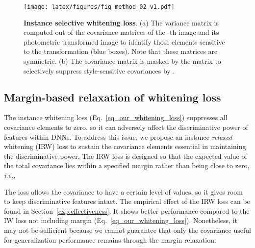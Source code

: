 \documentclass[final]{latex/cvpr}
\begin{document}
\begin{figure*}[ht!]
\vspace*{-0.0cm}
  \centering\texttt{[image: latex/figures/fig\_method\_02\_v1.pdf]}
  \vspace*{-0.0cm}
  \caption{\textbf{Instance selective whitening loss}. 
  (a) 
  The variance matrix  is computed out of the covariance matrices of the -th image  and its photometric transformed image  to identify those elements sensitive to the transformation (blue boxes).
  Note that these matrices are symmetric.
  (b) The covariance matrix  is masked by the matrix  to selectively suppress style-sensitive covariances by .
}
\label{fig:disentangling_covariance}
\vspace{-0.45cm}
\end{figure*}









\vspace*{-0.18cm}
\subsection{Margin-based relaxation of whitening loss}
\vspace*{-0.12cm}
The instance whitening loss (Eq.~\eqref{eq_our_whitening_loss}) suppresses all covariance elements to zero, so it can adversely affect the discriminative power of features within DNNs. To address this issue, we propose an instance-\emph{relaxed} whitening (IRW) loss to sustain the covariance elements essential in maintaining the discriminative power. The IRW loss is designed so that the expected value of the total covariance lies within a specified margin  rather than being close to zero, \textit{i.e.,} 

The loss  allows the covariance to have a certain level of values, so it gives room to keep discriminative features intact. The empirical effect of the IRW loss can be found in Section~\ref{exp:effectiveness}. It shows better performance compared to the IW loss not including margin  (Eq.~\eqref{eq_our_whitening_loss}). Nonetheless, it may not be sufficient because we cannot guarantee that only the covariance useful for generalization performance remains through the margin relaxation.







\vspace*{-0.05cm}
\end{document}
